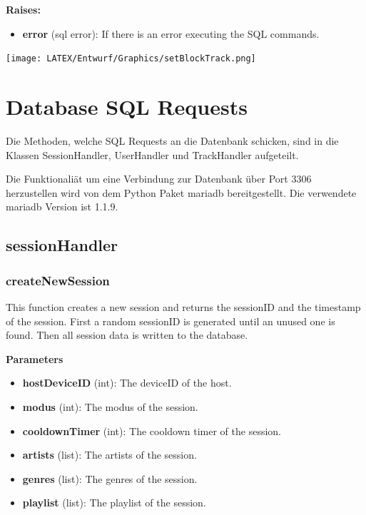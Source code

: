 \documentclass[oneside, ngerman]{sdqtechreport}
\begin{document}
\textbf{Raises:}

\begin{itemize}
    \item \textbf{error} (sql error): If there is an error executing the SQL commands.
\end{itemize}

\begin{center}
   \texttt{[image: LATEX/Entwurf/Graphics/setBlockTrack.png]} 
\end{center}


\section{Database SQL Requests}

Die Methoden, welche SQL Requests an die Datenbank schicken, sind in die Klassen SessionHandler, UserHandler und TrackHandler aufgeteilt.

Die Funktionaliät um eine Verbindung zur Datenbank über Port 3306 herzustellen wird von dem Python Paket mariadb bereitgestellt. Die verwendete mariadb Version ist 1.1.9.

\subsection{sessionHandler}

\subsubsection{createNewSession}

This function creates a new session and returns the sessionID and the timestamp of the session. First a random sessionID is generated until an unused one is found. Then all session data is written to the database.

\textbf{Parameters}

\begin{itemize} \item \textbf{hostDeviceID} (int): The deviceID of the host. \item \textbf{modus} (int): The modus of the session. \item \textbf{cooldownTimer} (int): The cooldown timer of the session. \item \textbf{artists} (list): The artists of the session. \item \textbf{genres} (list): The genres of the session. \item \textbf{playlist} (list): The playlist of the session. \end{itemize}
\end{document}
